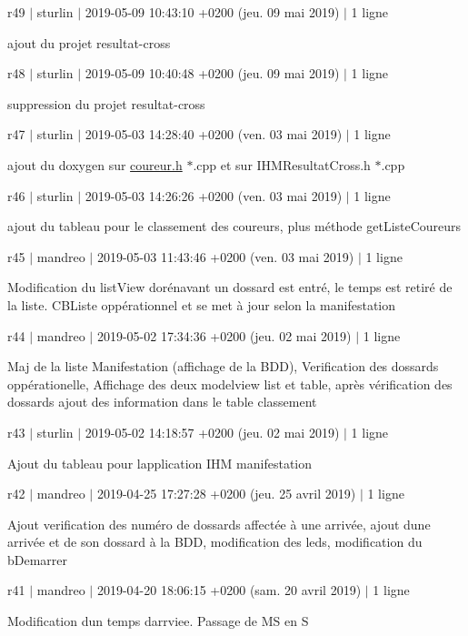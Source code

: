 r49 $\vert$ sturlin $\vert$ 2019-\/05-\/09 10\+:43\+:10 +0200 (jeu. 09 mai 2019) $\vert$ 1 ligne

ajout du projet resultat-\/cross

r48 $\vert$ sturlin $\vert$ 2019-\/05-\/09 10\+:40\+:48 +0200 (jeu. 09 mai 2019) $\vert$ 1 ligne

suppression du projet resultat-\/cross

r47 $\vert$ sturlin $\vert$ 2019-\/05-\/03 14\+:28\+:40 +0200 (ven. 03 mai 2019) $\vert$ 1 ligne

ajout du doxygen sur \hyperlink{coureur_8h}{coureur.\+h} $\ast$.cpp et sur I\+H\+M\+Resultat\+Cross.\+h $\ast$.cpp

r46 $\vert$ sturlin $\vert$ 2019-\/05-\/03 14\+:26\+:26 +0200 (ven. 03 mai 2019) $\vert$ 1 ligne

ajout du tableau pour le classement des coureurs, plus méthode get\+Liste\+Coureurs

r45 $\vert$ mandreo $\vert$ 2019-\/05-\/03 11\+:43\+:46 +0200 (ven. 03 mai 2019) $\vert$ 1 ligne

Modification du list\+View dorénavant un dossard est entré, le temps est retiré de la liste. C\+B\+Liste oppérationnel et se met à jour selon la manifestation

r44 $\vert$ mandreo $\vert$ 2019-\/05-\/02 17\+:34\+:36 +0200 (jeu. 02 mai 2019) $\vert$ 1 ligne

Maj de la liste Manifestation (affichage de la B\+DD), Verification des dossards oppérationelle, Affichage des deux modelview list et table, après vérification des dossards ajout des information dans le table classement

r43 $\vert$ sturlin $\vert$ 2019-\/05-\/02 14\+:18\+:57 +0200 (jeu. 02 mai 2019) $\vert$ 1 ligne

Ajout du tableau pour l\textquotesingle{}application I\+HM manifestation

r42 $\vert$ mandreo $\vert$ 2019-\/04-\/25 17\+:27\+:28 +0200 (jeu. 25 avril 2019) $\vert$ 1 ligne

Ajout verification des numéro de dossards affectée à une arrivée, ajout d\textquotesingle{}une arrivée et de son dossard à la B\+DD, modification des leds, modification du b\+Demarrer

r41 $\vert$ mandreo $\vert$ 2019-\/04-\/20 18\+:06\+:15 +0200 (sam. 20 avril 2019) $\vert$ 1 ligne

Modification d\textquotesingle{}un temps d\textquotesingle{}arrviee. Passage de MS en S

